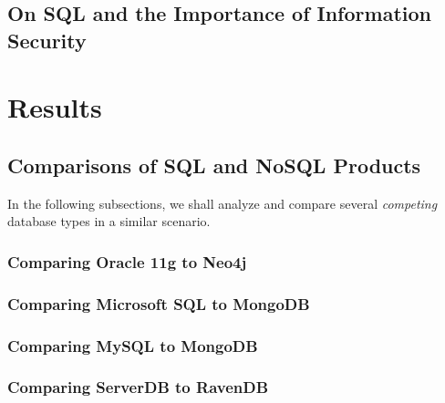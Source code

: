 \documentclass[10pt,        %
               a4paper,     %
               journal,     %
               ]{IEEEtran}
\begin{document}
\subsection{On SQL and the Importance of Information Security}
\section{Results} 
\subsection{Comparisons of SQL and NoSQL Products}
In the following subsections, we shall analyze and compare several \textit{competing} database types in a similar scenario.
\subsubsection{Comparing Oracle 11g to Neo4j}

\subsubsection{Comparing Microsoft SQL to MongoDB}

\subsubsection{Comparing MySQL to MongoDB}

\subsubsection{Comparing ServerDB to RavenDB}

%
\end{document}
